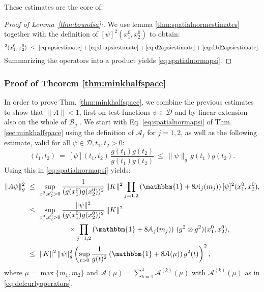 \documentclass[b5paper,draft,openbib,12pt]{memoir}
\newcommand{\id}{\mathbbm{1}}
\newcommand{\Banach}{\mathscr{B}}
\begin{document}
These estimates are the core of:

\begin{proof}[Proof of Lemma\ \ref{thm:boundsa}:]
	
	We use lemma \ref{thm:spatialnormestimates} together with the definition of $[\psi]^2(x_1^0,x_2^0)$ to obtain:
  \begin{equation}
		[A \psi]^2(x_1^0,x_2^0) ~\leq~ \eqref{eq:apsiestimate} + \eqref{eq:d1apsiestimate}+ \eqref{eq:d2apsiestimate}+ \eqref{eq:d1d2apsiestimate}.
  \end{equation}
	Summarizing the operators into a product yields \eqref{eq:spatialnormapsi}.

\end{proof}

\subsubsection{Proof of Theorem \ref{thm:minkhalfspace}} \label{sec:proofminkhalfspace}

In order to prove Thm. \ref{thm:minkhalfspace}, we combine the 
previous estimates to show that \(\|A\|<1\), first on test 
functions $\psi \in \mathscr{D}$ and by linear extension also on the 
whole of $\Banach_g$ . We start with Eq. \eqref{eq:spatialnormapsi} 
of Thm. \ref{sec:minkhalfspace} using the definition of 
\(\mathcal{A}_j\) for \(j=1,2\), as well as the following 
estimate, valid for all \(\psi \in \mathscr{D}, t_1,t_2>0\):
\begin{equation}
	[\psi](t_1,t_2) ~=~ [\psi](t_1,t_2) \, \frac{g(t_1)g(t_2)}{g(t_1)g(t_2)} ~\le~ \|\psi\|_g\, g(t_1)g(t_2).
\end{equation}
Using this in \eqref{eq:spatialnormapsi} yields:
\begin{align}
\|A\psi\|^2_g ~&\le~ \sup_{x_1^0,x_2^0>0}\frac{1}{(g(x_1^0)g(x_2^0))^2} \,  \|K\|^2 \prod_{j=1,2} \left( \id + 8\mathcal{A}_j(m_j) \right) [\psi]^2(x_1^0,x_2^0),\\\nonumber
&\le~ \sup_{x_1^0,x_2^0>0} \frac{\|\psi\|^2}{(g(x_1^0)g(x_2^0))^2} \,  \|K\|^2\\
& \hspace{2cm}\times\prod_{j=1,2} \left( \id + 8\mathcal{A}_j(m_j) \right) \, (g^2\otimes g^2)(x_1^0,x_2^0),\\
&\le~ \|K\|^2\, \|\psi\|^2_g \left( \sup_{t>0}\frac{1}{g(t)^2} \left( \id + 8\mathcal{A}(\mu) \right)g^2 (t) \right)^2,
\label{est:NormA1}
\end{align}
where $\mu = \max \{ m_1,m_2\}$ and 
$\mathcal{A}(\mu) = \sum_{k=1}^4 \mathcal{A}^{(k)}(\mu)$ with 
$ \mathcal{A}^{(k)}(\mu)$ as in \eqref{eq:defcurlyoperators}.
\end{document}
